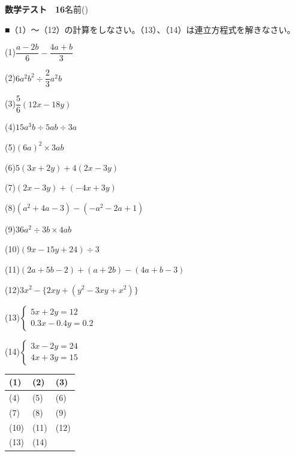 \documentclass[a4paper,11pt]{ltjsarticle}
\newlength{\qcol}\setlength{\qcol}{0.47\textwidth}
\newlength{\qgap}
\newlength{\anscolw}\setlength{\anscolw}{0.30\textwidth}
\newlength{\ansh}
\newcommand{\Q}[2]{\parbox[t]{\qcol}{\raggedright (#1)\hspace{0.6em}$\displaystyle #2$}}
\newcommand{\QR}[4]{\Q{#1}{#2}\hfill\Q{#3}{#4}\par\vspace{\qgap}}
\newcommand{\anscell}[1]{\rule[-\ansdrop]{0pt}{\ansh}(#1)}
\newlength{\ansdrop}
\begin{document}
{\large\bfseries 数学テスト　16}\hfill 名前(\underline{\hspace{32mm}})\par\vspace{3mm}
■（1）〜（12）の計算をしなさい。（13）、（14）は連立方程式を解きなさい。\par\vspace{3mm}
\setlength{\qgap}{11mm}
\QR{1}{\dfrac{a-2b}{6}-\dfrac{4a+b}{3}}{2}{6a^2b^2\div\dfrac{2}{3}a^2b}
\QR{3}{\dfrac{5}{6}(12x-18y)}{4}{15a^3b\div5ab\div3a}
\QR{5}{(6a)^2\times3ab}{6}{5(3x+2y)+4(2x-3y)}
\QR{7}{(2x-3y)+(-4x+3y)}{8}{(a^2+4a-3)-(-a^2-2a+1)}
\QR{9}{36a^2\div3b\times4ab}{10}{(9x-15y+24)\div3}
\QR{11}{(2a+5b-2)+(a+2b)-(4a+b-3)}{12}{3x^2-\{2xy+(y^2-3xy+x^2)\}}
\QR{13}{\left\{\begin{array}{l} 5x+2y=12 \\ 0.3x-0.4y=0.2 \end{array}\right.}{14}{\left\{\begin{array}{l} 3x-2y=24 \\ 4x+3y=15 \end{array}\right.}
\vfill
\setlength{\ansh}{12mm}\setlength{\ansdrop}{8mm}%
\begin{center}\begin{tabular}{|p{\anscolw}|p{\anscolw}|p{\anscolw}|}\hline
\anscell{1} & \anscell{2} & \anscell{3} \\\hline
\anscell{4} & \anscell{5} & \anscell{6} \\\hline
\anscell{7} & \anscell{8} & \anscell{9} \\\hline
\anscell{10} & \anscell{11} & \anscell{12} \\\hline
\anscell{13} & \anscell{14} &  \\\hline
\end{tabular}\end{center}
\end{document}
